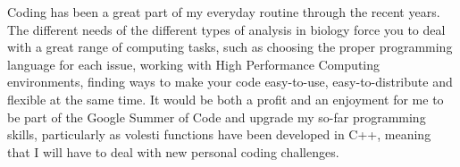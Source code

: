 \documentclass{article}
\begin{document}
Coding has been a great part of my everyday routine through the recent years. 
The different needs of the different types of analysis in biology force you to deal with a great range of computing tasks, such as choosing the proper programming language for each issue, working with High Performance Computing environments, finding ways to make your code easy-to-use, easy-to-distribute and flexible at the same time. 
It would be both a profit and an enjoyment for me to be part of the Google Summer of Code and upgrade my so-far programming skills, particularly as volesti functions have been developed in C++, meaning that I will have to deal with new personal coding challenges. 











\printbibliography
\end{document}
